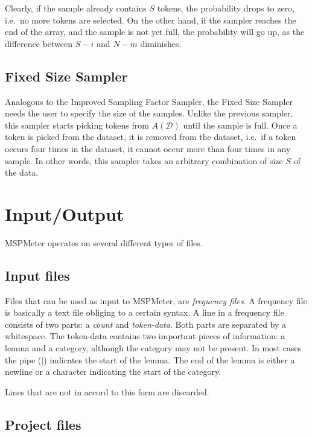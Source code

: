 \documentclass{article}
\begin{document}
Clearly, if the sample already contains $S$ tokens, the probability drops to zero, i.e.\ no more tokens are selected. On the other hand, if the sampler reaches the end of the array, and the sample is not yet full, the probability will go up, as the difference between $S-i$ and $N-m$ diminishes.


\subsection{Fixed Size Sampler}

Analogous to the Improved Sampling Factor Sampler, the Fixed Size Sampler needs the user to specify the size of the samples. Unlike the previous sampler, this sampler starts picking tokens from $A(\mathcal{D})$ until the sample is full. Once a token is picked from the dataset, it is removed from the dataset, i.e.\ if a token occurs four times in the dataset, it cannot occur more than four times in any sample. In other words, this sampler takes an arbitrary combination of size $S$ of the data. 






\section{Input/Output}

MSPMeter operates on several different types of files. 



\subsection{Input files}

Files that can be used as input to MSPMeter, are \emph{frequency files}. A frequency file is basically a text file obliging to a certain syntax. A line in a frequency file consists of two parts: a \emph{count} and \emph{token-data}. Both parts are separated by a whitespace. The token-data contains two important pieces of information: a lemma and a category, although the category may not be present. In most cases the pipe ($|$) indicates the start of the lemma. The end of the lemma is either a newline or a character indicating the start of the category. 

Lines that are not in accord to this form are discarded.


\subsection{Project files}
\end{document}
